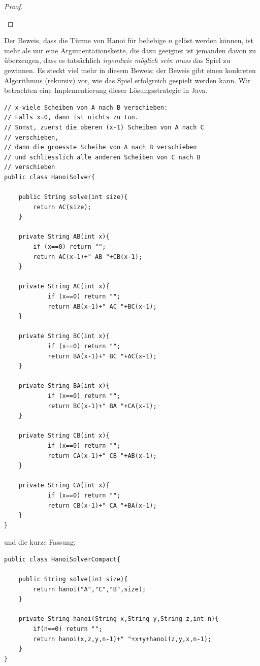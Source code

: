 \begin{example}
\begin{proof}
\begin{itemize}
\end{itemize}
\end{proof}
\begin{remark}
Der Beweis, dass die Türme von Hanoi für beliebige $n$ gelöst werden können, ist mehr als nur eine Argumentationskette, die dazu geeignet ist jemanden davon zu überzeugen, dass es tatsächlich \textit{irgendwie möglich sein muss} das Spiel zu gewinnen. Es steckt viel mehr in diesem Beweis; der Beweis gibt einen konkreten Algorithmus (rekursiv) vor, wie das Spiel erfolgreich gespielt werden kann. Wir betrachten eine Implementierung dieser Lösungsstrategie in Java.


\lstset{language=Java}
\begin{framed}
\begin{lstlisting}
// x-viele Scheiben von A nach B verschieben:
// Falls x=0, dann ist nichts zu tun.
// Sonst, zuerst die oberen (x-1) Scheiben von A nach C
// verschieben,
// dann die groesste Scheibe von A nach B verschieben
// und schliesslich alle anderen Scheiben von C nach B
// verschieben
public class HanoiSolver{

    public String solve(int size){
        return AC(size);
    }

    private String AB(int x){
        if (x==0) return "";
        return AC(x-1)+" AB "+CB(x-1);
    }

    private String AC(int x){
            if (x==0) return "";
            return AB(x-1)+" AC "+BC(x-1);
    }

    private String BC(int x){
            if (x==0) return "";
            return BA(x-1)+" BC "+AC(x-1);
    }

    private String BA(int x){
            if (x==0) return "";
            return BC(x-1)+" BA "+CA(x-1);
    }

    private String CB(int x){
            if (x==0) return "";
            return CA(x-1)+" CB "+AB(x-1);
    }

    private String CA(int x){
            if (x==0) return "";
            return CB(x-1)+" CA "+BA(x-1);
    }
}
\end{lstlisting}
\end{framed}
und die kurze Fassung:
\begin{framed}
\begin{lstlisting}
public class HanoiSolverCompact{

    public String solve(int size){
        return hanoi("A","C","B",size);
    }

    private String hanoi(String x,String y,String z,int n){
        if(n==0) return "";
        return hanoi(x,z,y,n-1)+" "+x+y+hanoi(z,y,x,n-1);
    }
}
\end{lstlisting}
\end{framed}


\end{remark}
\end{example}
